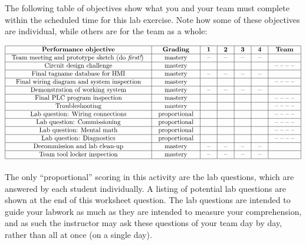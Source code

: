 \begin{itemize}
The following table of objectives show what you and your team must complete within the scheduled time for this lab exercise.  Note how some of these objectives are individual, while others are for the team as a whole:

\vskip 10pt



$$\vbox{\offinterlineskip
\halign{\strut
\vrule \quad\hfil # \ \hfil & 
\vrule \quad\hfil # \ \hfil & 
\vrule \quad\hfil # \ \hfil & 
\vrule \quad\hfil # \ \hfil & 
\vrule \quad\hfil # \ \hfil & 
\vrule \quad\hfil # \ \hfil & 
\vrule \quad\hfil # \ \hfil \vrule \cr
\noalign{\hrule}
%
{\bf Performance objective} & {\bf Grading} & {\bf 1} & {\bf 2} & {\bf 3} & {\bf 4} & {\bf Team} \cr
%
\noalign{\hrule}
%
Team meeting and prototype sketch (do {\it first!}) & mastery & -- & -- & -- & -- & \cr
%
\noalign{\hrule}
%
Circuit design challenge & mastery & & & & & -- -- -- -- \cr
%
\noalign{\hrule}
%
Final tagname database for HMI & mastery & -- & -- & -- & -- & \cr
%
\noalign{\hrule}
%
Final wiring diagram and system inspection & mastery & & & & & -- -- -- -- \cr
%
\noalign{\hrule}
%
Demonstration of working system & mastery & -- & -- & -- & -- & \cr
%
\noalign{\hrule}
%
Final PLC program inspection & mastery &  &  &  &  & -- -- -- --  \cr
%
\noalign{\hrule}
%
Troubleshooting & mastery & & & & & -- -- -- -- \cr
%
\noalign{\hrule}
%
Lab question: Wiring connections & proportional &  &  &  &  & -- -- -- -- \cr
%
\noalign{\hrule}
%
Lab question: Commissioning & proportional &  &  &  &  & -- -- -- -- \cr
%
\noalign{\hrule}
%
Lab question: Mental math & proportional &  &  &  &  & -- -- -- -- \cr
%
\noalign{\hrule}
%
Lab question: Diagnostics & proportional &  &  &  &  & -- -- -- -- \cr
%
\noalign{\hrule}
%
Decommission and lab clean-up & mastery & -- & -- & -- & -- &  \cr
%
\noalign{\hrule}
%
Team tool locker inspection & mastery & -- & -- & -- & -- &  \cr
%
\noalign{\hrule}
} %
}$$ %

The only ``proportional'' scoring in this activity are the lab questions, which are answered by each student individually.  A listing of potential lab questions are shown at the end of this worksheet question.  The lab questions are intended to guide your labwork as much as they are intended to measure your comprehension, and as such the instructor may ask these questions of your team day by day, rather than all at once (on a single day).


\end{itemize}
